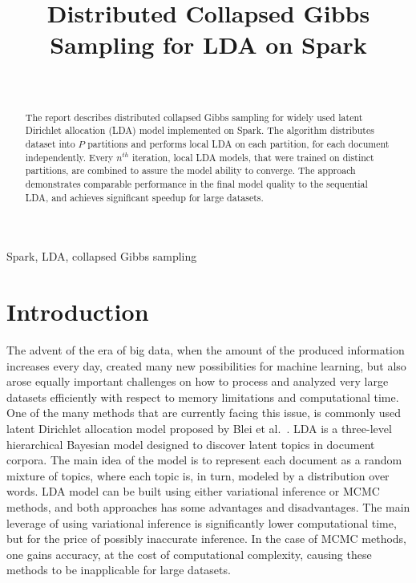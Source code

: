 \documentclass[journal]{IEEEtran}
\begin{document}
\title{Distributed Collapsed Gibbs Sampling for LDA on Spark}

\author{\\
}


\maketitle

\begin{abstract}
The report describes distributed collapsed Gibbs sampling for widely used latent Dirichlet allocation (LDA) model implemented on Spark. The algorithm distributes dataset into $P$ partitions and performs local LDA on each partition, for each document independently. Every $n^{th}$ iteration, local LDA models, that were trained on distinct partitions, are combined to assure the model ability to converge. The approach demonstrates comparable performance in the final model quality to the sequential LDA, and achieves significant speedup for large datasets.
\end{abstract}


\begin{IEEEkeywords}
Spark, LDA, collapsed Gibbs sampling
\end{IEEEkeywords}


\section{Introduction}
The advent of the era of big data, when the amount of the produced information increases every day, created many new possibilities for machine learning, but also arose equally important challenges on how to process and analyzed very large datasets efficiently with respect to memory limitations and computational time. One of the many methods that are currently facing this issue, is commonly used latent Dirichlet allocation model proposed by Blei et al.~\cite{blei2003latent}. LDA is a three-level hierarchical Bayesian model designed to discover latent topics in document corpora. The main idea of the model is to represent each document as a random mixture of topics, where each topic is, in turn, modeled by a distribution over words. LDA model can be built using either variational inference or MCMC methods, and both approaches has some advantages and disadvantages. The main leverage of using variational inference is significantly lower computational time, but for the price of possibly inaccurate inference. In the case of MCMC methods, one gains accuracy, at the cost of computational complexity, causing these methods to be  inapplicable for large datasets.
\end{document}
